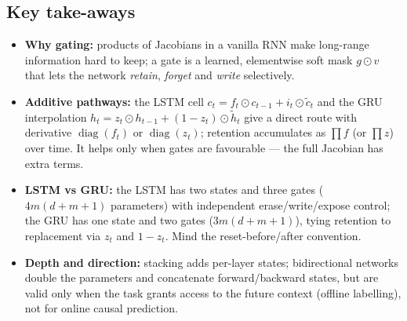\documentclass[11pt,a4paper]{article}
\newcommand{\diag}{\operatorname{diag}}
\newcommand{\tc}{\tilde c}
\newcommand{\thh}{\tilde h}
\begin{document}
\subsection*{Key take-aways}
\begin{itemize}
 \item \textbf{Why gating:} products of Jacobians in a vanilla RNN make long-range information hard to keep; a gate is a learned, elementwise soft mask $g\odot v$ that lets the network \emph{retain}, \emph{forget} and \emph{write} selectively.
 \item \textbf{Additive pathways:} the LSTM cell $c_t=f_t\odot c_{t-1}+i_t\odot\tc_t$ and the GRU interpolation $h_t=z_t\odot h_{t-1}+(1-z_t)\odot\thh_t$ give a direct route with derivative $\diag(f_t)$ or $\diag(z_t)$; retention accumulates as $\prod f$ (or $\prod z$) over time. It helps only when gates are favourable --- the full Jacobian has extra terms.
 \item \textbf{LSTM vs GRU:} the LSTM has two states and three gates ($4m(d+m+1)$ parameters) with independent erase/write/expose control; the GRU has one state and two gates ($3m(d+m+1)$), tying retention to replacement via $z_t$ and $1-z_t$. Mind the reset-before/after convention.
 \item \textbf{Depth and direction:} stacking adds per-layer states; bidirectional networks double the parameters and concatenate forward/backward states, but are valid only when the task grants access to the future context (offline labelling), not for online causal prediction.
\end{itemize}
\end{document}
